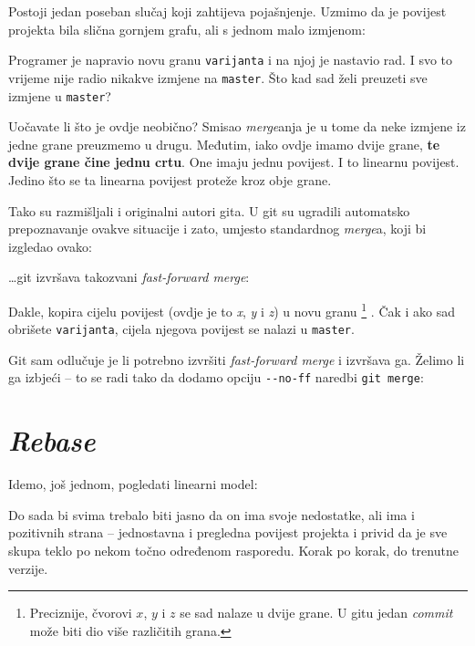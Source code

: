 Postoji jedan poseban slučaj koji zahtijeva pojašnjenje.
Uzmimo da je povijest projekta bila slična gornjem grafu, ali s jednom malo izmjenom:



Programer je napravio novu granu \verb+varijanta+ i na njoj je nastavio rad.
I svo to vrijeme nije radio nikakve izmjene na \verb+master+.
Što kad sad želi preuzeti sve izmjene u \verb+master+?

Uočavate li što je ovdje neobično?
Smisao \emph{merge}anja je u tome da neke izmjene iz jedne grane preuzmemo u drugu.
Međutim, iako ovdje imamo dvije grane, \textbf{te dvije grane čine jednu crtu}. 
One imaju jednu povijest. 
I to linearnu povijest.
Jedino što se ta linearna povijest proteže kroz obje grane.

Tako su razmišljali i originalni autori gita.
U git su ugradili automatsko prepoznavanje ovakve situacije i zato, umjesto standardnog \emph{merge}a, koji bi izgledao ovako:



\dots{}git izvršava takozvani \emph{fast-forward merge}:



Dakle, kopira cijelu povijest (ovdje je to \emph x, \emph y i \emph z) u novu granu%
\footnote{Preciznije, čvorovi $x$, $y$ i $z$ se sad nalaze u dvije grane. U gitu jedan \emph{commit} može biti dio više različitih grana.}%
.
Čak i ako sad obrišete \verb+varijanta+, cijela njegova povijest se nalazi u \verb+master+.

Git sam odlučuje je li potrebno izvršiti \emph{fast-forward merge} i izvršava ga.
Želimo li ga izbjeći -- to se radi tako da dodamo opciju \verb+--no-ff+ naredbi \verb+git merge+:


\section*{\emph{Rebase}}

Idemo, još jednom, pogledati linearni model:



Do sada bi svima trebalo biti jasno da on ima svoje nedostatke, ali ima i pozitivnih strana -- jednostavna i pregledna povijest projekta i privid da je sve skupa teklo po nekom točno određenom rasporedu.
Korak po korak, do trenutne verzije.

